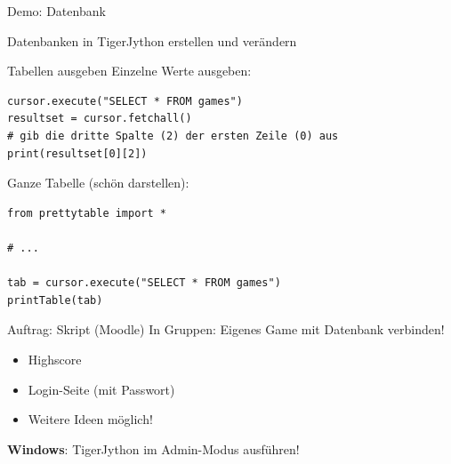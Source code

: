 \begin{frame}[fragile]{Demo: Datenbank}
\begin{center}
Datenbanken in TigerJython erstellen und verändern
\end{center}
\end{frame}

\begin{frame}[fragile]{Tabellen ausgeben}
Einzelne Werte ausgeben:
\begin{lstlisting}[style=Python]
cursor.execute("SELECT * FROM games")
resultset = cursor.fetchall()
# gib die dritte Spalte (2) der ersten Zeile (0) aus
print(resultset[0][2]) 
\end{lstlisting}

Ganze Tabelle (schön darstellen):
\begin{lstlisting}[style=Python]
from prettytable import *

# ... 

tab = cursor.execute("SELECT * FROM games")
printTable(tab)
\end{lstlisting}


\end{frame}

\begin{frame}[fragile]{Auftrag: Skript (Moodle)}
In Gruppen: Eigenes Game mit Datenbank verbinden!
\begin{itemize}
\item Highscore
\item Login-Seite (mit Passwort)
\item Weitere Ideen möglich!
\end{itemize}
\begin{myattention}
\faWindows{} \textbf{Windows}: TigerJython im Admin-Modus ausführen!
\end{myattention}
\end{frame}
